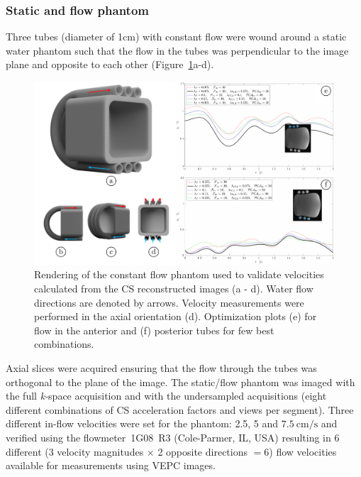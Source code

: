 \subsubsection{Static and flow phantom}
Three tubes (diameter of 1cm) with constant flow were wound around a static water phantom such that the flow in the tubes was perpendicular to the image plane and opposite to each other (Figure~\ref{fig: CSS1}a-d).
\begin{figure}[!htb]
\vspace{+0.2cm}
\centering
\includegraphics[width=1\textwidth]{Figures/CS1_3.pdf}
\caption[Rendering of the constant flow phantom and optimization plots]{Rendering of the constant flow phantom used to validate velocities calculated from the CS reconstructed images (a - d). Water flow directions are denoted by arrows. Velocity measurements were performed in the axial orientation (d). Optimization plots (e) for flow in the anterior and (f) posterior tubes for few best combinations.}
\label{fig: CSS1}
\end{figure}
Axial slices were acquired ensuring that the flow through the tubes was orthogonal to the plane of the image. 
The static/flow phantom was imaged with the full \mbox{\textit{k-}space} acquisition and with the undersampled acquisitions (eight different combinations of CS acceleration factors and views per segment). 
Three different in-flow velocities were set for the phantom: 2.5, 5 and $\SI{7.5}{\centi\meter/\second}$ and verified using the flowmeter~1G08~R3 (Cole-Parmer, IL, USA) resulting in 6 different (3 velocity magnitudes $\times$ 2 opposite directions $= 6$) flow velocities available for measurements using VEPC images.

